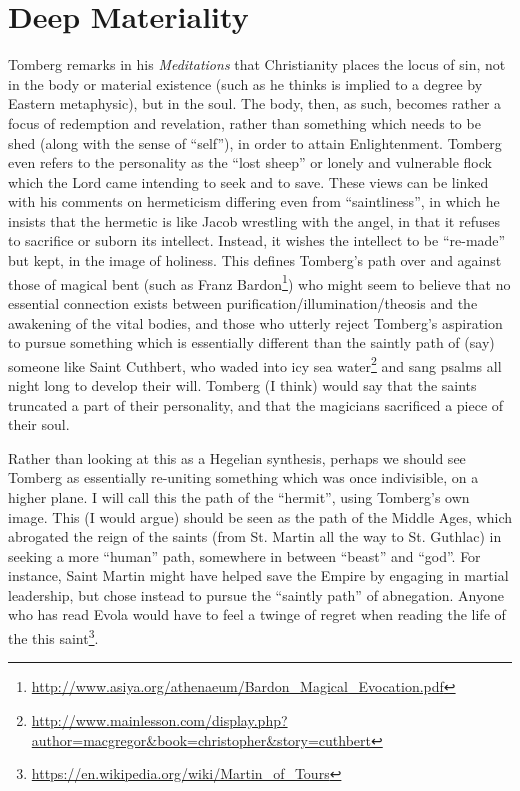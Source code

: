\section{Deep Materiality}

Tomberg remarks in his \emph{Meditations} that Christianity places the locus of sin, not in the body or material existence (such as he thinks is implied to a degree by Eastern metaphysic), but in the soul. The body, then, as such, becomes rather a focus of redemption and revelation, rather than something which needs to be shed (along with the sense of ``self''), in order to attain Enlightenment. Tomberg even refers to the personality as the ``lost sheep'' or lonely and vulnerable flock which the Lord came intending to seek and to save. These views can be linked with his comments on hermeticism differing even from ``saintliness'', in which he insists that the hermetic is like Jacob wrestling with the angel, in that it refuses to sacrifice or suborn its intellect. Instead, it wishes the intellect to be ``re-made'' but kept, in the image of holiness. This defines Tomberg's path over and against those of magical bent (such as Franz Bardon\footnote{\url{http://www.asiya.org/athenaeum/Bardon\_Magical\_Evocation.pdf}}) who might seem to believe that no essential connection exists between purification/illumination/theosis and the awakening of the vital bodies, and those who utterly reject Tomberg's aspiration to pursue something which is essentially different than the saintly path of (say) someone like Saint Cuthbert, who waded into icy sea water\footnote{\url{http://www.mainlesson.com/display.php?author=macgregor&book=christopher&story=cuthbert}} and sang psalms all night long to develop their will. Tomberg (I think) would say that the saints truncated a part of their personality, and that the magicians sacrificed a piece of their soul.

Rather than looking at this as a Hegelian synthesis, perhaps we should see Tomberg as essentially re-uniting something which was once indivisible, on a higher plane. I will call this the path of the ``hermit'', using Tomberg's own image. This (I would argue) should be seen as the path of the Middle Ages, which abrogated the reign of the saints (from St. Martin all the way to St. Guthlac) in seeking a more ``human'' path, somewhere in between ``beast'' and ``god''. For instance, Saint Martin might have helped save the Empire by engaging in martial leadership, but chose instead to pursue the ``saintly path'' of abnegation. Anyone who has read Evola would have to feel a twinge of regret when reading the life of the this saint\footnote{\url{https://en.wikipedia.org/wiki/Martin\_of\_Tours}}.

